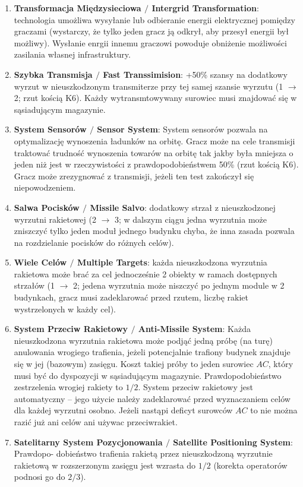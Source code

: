 \documentclass[11pt,a4paper]{article}
\begin{document}
\begin{enumerate}
\item \textbf{Transformacja Międzysieciowa $/$ Intergrid Transformation}: technologia umożliwa wysyłanie lub odbieranie energii elektrycznej pomiędzy graczami (wystarczy, że tylko jeden gracz ją odkrył, aby przesył energii był możliwy). Wysłanie enrgii innemu graczowi powoduje obniżenie możliwości zasilania własnej infrastruktury.
\item \textbf{Szybka Transmisja $/$ Fast Transsimision}: +50\% szansy na dodatkowy wyrzut w nieuszkodzonym transmiterze przy tej samej szansie wyrzutu (1 $\to$ 2; rzut kością K6). Każdy wytransmtowywany surowiec musi znajdować się w sąsiadującym magazynie.
\item \textbf{System Sensorów $/$ Sensor System}: System sensorów pozwala na optymalizację wynoszenia ładunków na orbitę. Gracz może na cele transmisji traktować trudność wynoszenia towarów na orbitę tak jakby była mniejsza o jeden niż jest w rzeczywistości z prawdopodobieństwem 50\% (rzut kością K6). Gracz może zrezygnować z transmisji, jeżeli ten test zakończył się niepowodzeniem.
\item \textbf{Salwa Pocisków $/$ Missile Salvo}: dodatkowy strzał z nieuszkodzonej wyrzutni rakietowej (2 $\to$ 3; w dalszym ciągu jedna wyrzutnia może zniszczyć tylko jeden moduł jednego budynku chyba, że inna zasada pozwala na rozdzielanie pocisków do różnych celów).
\item \textbf{Wiele Celów $/$ Multiple Targets}: każda nieuszkodzona wyrzutnia rakietowa może brać za cel jednocześnie 2 obiekty w ramach dostępnych strzałów (1 $\to$ 2; jedena wyrzutnia może niszczyć po jednym module w 2 budynkach, gracz musi zadeklarować przed rzutem, liczbę rakiet wystrzelonych w każdy cel).
\item \textbf{System Przeciw Rakietowy $/$ Anti-Missile System}: Każda nieuszkodzona wyrzutnia rakietowa może podjąć jedną próbę (na turę) anulowania wrogiego trafienia, jeżeli potencjalnie trafiony budynek znajduje się w jej (bazowym) zasięgu. Koszt takiej próby to jeden surowiec $AC$, który musi być do dyspozycji w sąsiadującym magazynie. Prawdopodobieństwo zestrzelenia wrogiej rakiety to $1/2$. System przeciw rakietowy jest automatyczny -- jego użycie należy zadeklarować przed wyznaczaniem celów dla każdej wyrzutni osobno. Jeżeli nastąpi deficyt surowców $AC$ to nie można razić już ani celów ani używac przeciwrakiet.
\item \textbf{Satelitarny System Pozycjonowania $/$ Satellite Positioning System}: Prawdopo- dobieństwo trafienia rakietą przez nieuszkodzoną wyrzutnie rakietową w rozszerzonym zasięgu jest  wzrasta do $1/2$ (korekta operatorów podnosi go do $2/3$).

\end{enumerate}
\end{document}
